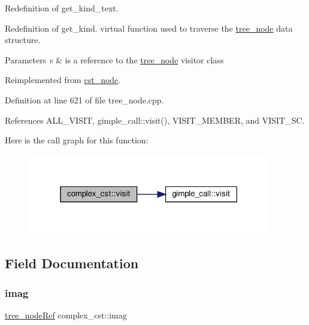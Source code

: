Redefinition of get\+\_\+kind\+\_\+text. 

Redefinition of get\+\_\+kind. virtual function used to traverse the \hyperlink{classtree__node}{tree\+\_\+node} data structure. 
\begin{DoxyParams}{Parameters}
{\em v} & is a reference to the \hyperlink{classtree__node}{tree\+\_\+node} visitor class \\
\hline
\end{DoxyParams}


Reimplemented from \hyperlink{structcst__node_a64e2bc20ffda1b13ffe894cacb982f89}{cst\+\_\+node}.



Definition at line 621 of file tree\+\_\+node.\+cpp.



References A\+L\+L\+\_\+\+V\+I\+S\+IT, gimple\+\_\+call\+::visit(), V\+I\+S\+I\+T\+\_\+\+M\+E\+M\+B\+ER, and V\+I\+S\+I\+T\+\_\+\+SC.

Here is the call graph for this function\+:
\nopagebreak
\begin{figure}[H]
\begin{center}
\leavevmode
\includegraphics[width=301pt]{df/d24/structcomplex__cst_aa98d0db16f586dd9ca9b16a468b67d2e_cgraph}
\end{center}
\end{figure}


\subsection{Field Documentation}
\mbox{\label{structcomplex__cst_aef2b08e051964d75a6d44d3031db8baa}} 
\subsubsection{\texorpdfstring{imag}{imag}}
{\footnotesize\ttfamily \hyperlink{tree__node_8hpp_a6ee377554d1c4871ad66a337eaa67fd5}{tree\+\_\+node\+Ref} complex\+\_\+cst\+::imag}



